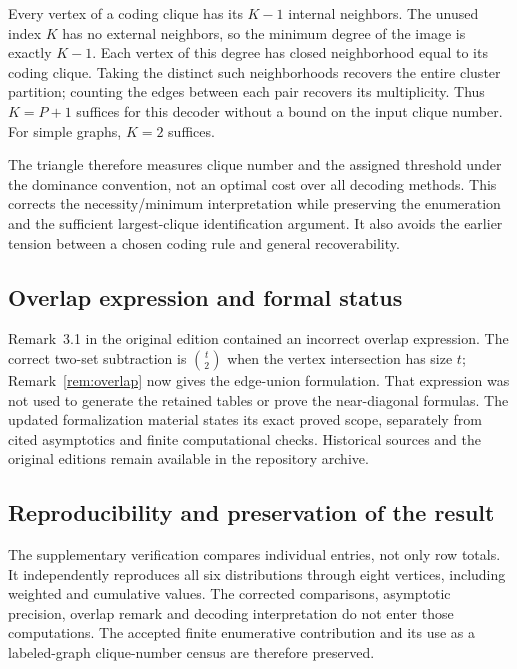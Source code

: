 \documentclass[11pt,a4paper]{article}
\theoremstyle{definition}
\begin{document}
Every vertex of a coding clique has its $K-1$ internal neighbors.
The unused index $K$ has no external neighbors, so the minimum
degree of the image is exactly $K-1$. Each vertex of this degree
has closed neighborhood equal to its coding clique. Taking the
distinct such neighborhoods recovers the entire cluster partition;
counting the edges between each pair recovers its multiplicity.
Thus $K=P+1$ suffices for this decoder without a bound on the
input clique number. For simple graphs, $K=2$ suffices.

The triangle therefore measures clique number and the assigned
threshold under the dominance convention, not an optimal cost
over all decoding methods. This corrects the necessity/minimum
interpretation while preserving the enumeration and the
sufficient largest-clique identification argument. It also avoids
the earlier tension between a chosen coding rule and general
recoverability.

\subsection{Overlap expression and formal status}
Remark~3.1 in the original edition contained an incorrect overlap
expression. The correct two-set subtraction is $\binom t2$ when
the vertex intersection has size $t$; Remark~\ref{rem:overlap} now
gives the edge-union formulation. That expression was not used
to generate the retained tables or prove the near-diagonal formulas.
The updated formalization material states its exact proved scope,
separately from cited asymptotics and finite computational checks.
Historical sources and the original editions remain available
in the repository archive.

\subsection{Reproducibility and preservation of the result}
The supplementary verification compares individual entries, not
only row totals. It independently reproduces all six distributions
through eight vertices, including weighted and cumulative values.
The corrected comparisons, asymptotic precision, overlap remark
and decoding interpretation do not enter those computations.
The accepted finite enumerative contribution and its use as a
labeled-graph clique-number census are therefore preserved.
\end{document}
